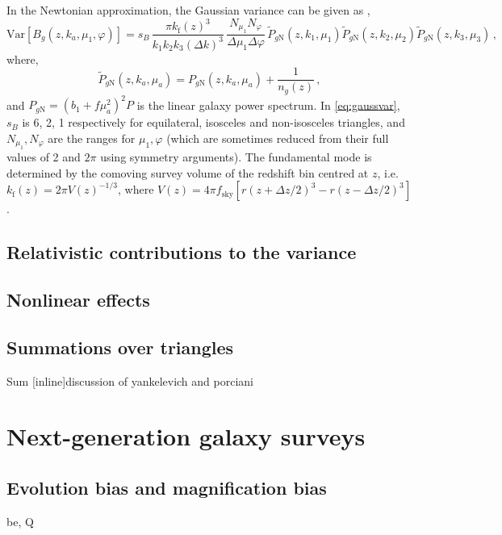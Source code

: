 In the Newtonian approximation, the Gaussian variance can be given as \citep{Scoccimarro:2003wn, Karagiannis:2018jdt},
\begin{equation}
\mathrm{Var} [{B_{g}}(z, k_a,\mu_{1},\varphi)] = s_B\, \frac{\pi k_{\mathrm{f}}(z)^3}{k_1k_2k_3 (\Delta k)^3}\,\frac{N_{\mu_1}N_\varphi}{\Delta \mu_1 \Delta \varphi} \, \tilde{P}_{g{\mathrm{N}}}(z,k_{1},\mu_{1}) \tilde{P}_{g{\mathrm{N}}}(z,k_{2},\mu_{2})\tilde{P}_{g{\mathrm{N}}}(z,k_{3},\mu_{3})\,,
\label{eq:gaussvar} 
\end{equation}
where,
\begin{equation}
\tilde{P}_{g{\mathrm{N}}}(z, k_{a}, \mu_{a}) = P_{g{\mathrm{N}}}(z, k_{a}, \mu_{a}) + \frac{1}{n_g(z)}\,, \label{eq:Pgdef} 
\end{equation}
and ${P}_{g{\mathrm{N}}}=(b_1+f\mu_a^2)^2P$ is the linear galaxy power spectrum.
In \eqref{eq:gaussvar}, $s_{B}$ is 6, 2, 1 respectively for equilateral, isosceles and non-isosceles triangles, and $N_{\mu_1},N_\varphi$ are the ranges for $\mu_1,  \varphi $ (which are sometimes reduced from their full values of 2 and $2\pi$ using symmetry arguments).
The fundamental mode is determined by the comoving survey volume of the redshift bin centred at $z$, i.e. $k_{\mathrm{f}}(z) = {2\pi}{V(z)^{-1/3}}$, where $V(z)=4\pi  f_{\mathrm{sky}}[r(z+\Delta z/2)^3 - r(z-\Delta z/2)^3]$.

\subsection{Relativistic contributions to the variance}

\subsection{Nonlinear effects}

\subsection{Summations over triangles}
Sum [inline]{discussion of yankelevich and porciani}

\section{Next-generation galaxy surveys}

\subsection{Evolution bias and magnification bias}
be, Q 

